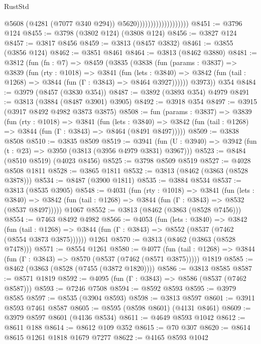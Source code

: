 \begin{lexlean}{RustStd}
\begin{coremodule}
{\begin{coremodule}
{{{{{{{{{{{{{{{{{{{{{{{{{{{{{{{{{{{                                          @5608
                                          (@4281 (@7077 @340 @294))
                                          @5620)))))))))))))))))))
@8451 := @3796 @124
@8455 := @3798 (@3802 @124) (@3808 @124)
@8456 := @3827 @124
@8457 := @3817 @8456
@8459 := @3813 (@8457 @3832)
@8461 := @3855 (@3856 @124)
@8462 := @3851 @8461
@8464 := @3813 (@8462 @3880)
@8481 := @3812
    (fun (fn : @7) =>
    @8459
      (@3835
        (@3838
          (fun (params : @3837) =>
          @3839
            (fun (rty : @1018) =>
            @3841
              (fun (lets : @3840) =>
              @3842 (fun (tail : @1268) => @3844 (fun (Γ : @3843) => @8464 @3927))))))
        @3973))
    @354
@8484 := @3979 (@8457 (@3830 @354))
@8487 := @3892 (@3893 @354) @4979
@8491 := @3813 (@3884 (@8487 @3901) @3905)
@8492 := @3918 @354
@8497 := @3915 (@3917 @8492 @4982 @3873 @3875)
@8508 := fun (params : @3837) =>
  @3839
    (fun (rty : @1018) =>
    @3841
      (fun (lets : @3840) =>
      @3842 (fun (tail : @1268) => @3844 (fun (Γ : @3843) => @8464 (@8491 @8497)))))
@8509 := @3838 @8508
@8510 := @3835 @8509
@8519 := @3941 (fun (U : @3940) => @3942 (fun (t : @23) => @3950 (@3813 (@3956 @4979 @3831) @3967)))
@8523 := @8484 (@8510 @8519) (@4023 @8456)
@8525 := @3798 @8509 @8519
@8527 := @4028 @8508 @1811
@8528 := @3865 @1811
@8532 := @3813 (@8462 (@3863 (@8528 @3878)))
@8534 := @8487 (@3900 @1811)
@8535 := @3884 @8534
@8537 := @3813 (@8535 @3905)
@8548 := @4031
    (fun (rty : @1018) =>
    @3841
      (fun (lets : @3840) =>
      @3842 (fun (tail : @1268) => @3844 (fun (Γ : @3843) => @8532 (@8537 @8497)))))
    @1067
@8552 := @3813 (@8462 (@3863 (@8528 @7456)))
@8554 := @7463 @8492 @4982
@8566 := @4053
    (fun (lets : @3840) =>
    @3842
      (fun (tail : @1268) => @3844 (fun (Γ : @3843) => @8552 (@8537 (@7462 (@8554 @3873 @3875))))))
    @1261
@8570 := @3813 (@8462 (@3863 (@8528 @7478)))
@8571 := @8554 @1261
@8580 := @4077
    (fun (tail : @1268) => @3844 (fun (Γ : @3843) => @8570 (@8537 (@7462 (@8571 @3875)))))
    @1819
@8585 := @8462 (@3863 (@8528 (@7455 (@3872 @1820))))
@8586 := @3813 @8585
@8587 := @8571 @1819
@8592 := @4095 (fun (Γ : @3843) => @8586 (@8537 (@7462 @8587)))
@8593 := @7246 @7508
@8594 := @8592 @8593
@8595 := @3979 @8585
@8597 := @8535 (@3904 @8593)
@8598 := @3813 @8597
@8601 := @3911 @8593 @7461 @8587
@8605 := @8595 (@8598 @8601) (@4131 @8461)
@8609 := @3979 @8597 @8601 (@4136 @8534)
@8611 := @4649 @8593 @1042
@8612 := @8611 @188
@8614 := @8612 @109 @352
@8615 := @70 @307
@8620 := @8614 @8615 @1261 @1818 @1679 @7277
@8622 := @4165 @8593 @1042
}}}}}}}}}}}}}}}}}}}}}}}}}}}}}}}}}}}
\end{coremodule}}
\end{coremodule}
\end{lexlean}
